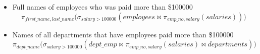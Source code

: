 \documentclass{assignment}
\begin{document}
\begin{itemize}[nolistsep]
\begin{equation*}
\begin{split}
                        &\qquad\pi_{\mathit{emp\_no},\mathit{dept\_no},\mathit{last\_name}}(\mathit{employees}
                    \bowtie \mathit{dept\_manager})\big)
                \Big)
            \end{split}
        \end{equation*}
    \item Full names of employees who was paid more than \$100000
        \[ \pi_{\mathit{first\_name},
            \mathit{last\_name}}\Big(\sigma_{\mathit{salary} >
                100000}(\mathit{employees} \bowtie \pi_{\mathit{emp\_no},
        \mathit{salary}}(\mathit{salaries}))\Big) \]
    \item Names of all departments that have employees paid more
        than \$100000
        \[ \pi_{\mathit{dept\_name}}\Big(\sigma_{\mathit{salary} >
                100000}(\mathit{dept\_emp} \bowtie
                    \pi_{\mathit{emp\_no},
                    \mathit{salary}}(\mathit{salaries}) \bowtie
        \mathit{departments})\Big) \]
\end{itemize}
\end{document}
